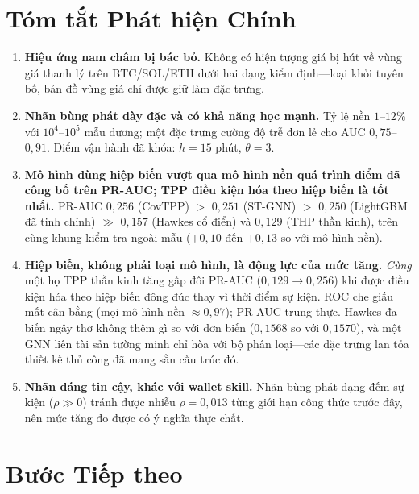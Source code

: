 \documentclass[11pt,a4paper]{article}
\begin{document}
\section{Tóm tắt Phát hiện Chính}

\begin{enumerate}[label=\textbf{F\arabic*:}]
    \item \textbf{Hiệu ứng nam châm bị bác bỏ.} Không có hiện tượng giá bị hút về vùng giá thanh lý trên BTC/SOL/ETH dưới hai dạng kiểm định---loại khỏi tuyên bố, bản đồ vùng giá chỉ được giữ làm đặc trưng.
    \item \textbf{Nhãn bùng phát dày đặc và có khả năng học mạnh.} Tỷ lệ nền $1$--$12\%$ với $10^4$--$10^5$ mẫu dương; một đặc trưng cường độ trễ đơn lẻ cho AUC $0{,}75$--$0{,}91$. Điểm vận hành đã khóa: $h=15$ phút, $\theta=3$.
    \item \textbf{Mô hình dùng hiệp biến vượt qua mô hình nền quá trình điểm đã công bố trên PR-AUC; TPP điều kiện hóa theo hiệp biến là tốt nhất.} PR-AUC $0{,}256$ (CovTPP) $>$ $0{,}251$ (ST-GNN) $>$ $0{,}250$ (LightGBM đã tinh chỉnh) $\gg$ $0{,}157$ (Hawkes cổ điển) và $0{,}129$ (THP thần kinh), trên cùng khung kiểm tra ngoài mẫu ($+0{,}10$ đến $+0{,}13$ so với mô hình nền).
    \item \textbf{Hiệp biến, không phải loại mô hình, là động lực của mức tăng.} \emph{Cùng} một họ TPP thần kinh tăng gấp đôi PR-AUC ($0{,}129\to0{,}256$) khi được điều kiện hóa theo hiệp biến đông đúc thay vì thời điểm sự kiện. ROC che giấu mất cân bằng (mọi mô hình nền $\approx 0{,}97$); PR-AUC trung thực. Hawkes đa biến ngây thơ không thêm gì so với đơn biến ($0{,}1568$ so với $0{,}1570$), và một GNN liên tài sản tường minh chỉ hòa với bộ phân loại---các đặc trưng lan tỏa thiết kế thủ công đã mang sẵn cấu trúc đó.
    \item \textbf{Nhãn đáng tin cậy, khác với wallet skill.} Nhãn bùng phát dạng đếm sự kiện ($\rho \gg 0$) tránh được nhiễu $\rho=0{,}013$ từng giới hạn công thức trước đây, nên mức tăng đo được có ý nghĩa thực chất.
\end{enumerate}

\section{Bước Tiếp theo}
\end{document}
